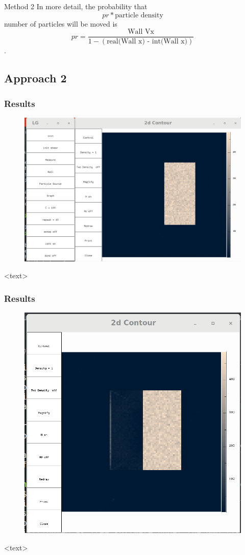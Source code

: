 \documentclass{beamer}
\begin{document}
\begin{frame}{Method 2}
In more detail, the probability that $$ pr * \textrm{particle density}$$ number of particles will be moved is $$pr = \frac{\textrm{Wall Vx}}{1-(\textrm{real(Wall x) - int(Wall x)})}$$.
\end{frame}

\subsection{Approach 2}
\begin{frame}
\frametitle{Results}
\begin{figure}
\includegraphics[scale=0.2]{A11p2}
\caption{}
\end{figure}
<text>
\end{frame}

\begin{frame}
\frametitle{Results}
\begin{figure}
\includegraphics[scale=0.2]{A11p5}
\caption{}
\end{figure}
<text>
\end{frame}
\end{document}
